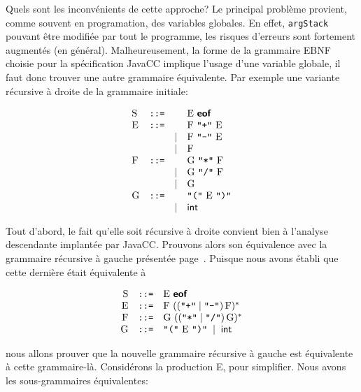 \documentclass[11pt,a4paper]{article}
\newcommand{\assign}{\mbox{\texttt{::=}}\xspace}
\newcommand{\JavaCC}{\textsf{JavaCC}\xspace}
\newcommand{\str}[1]{\texttt{"{#1}"}}
\newcommand{\eof}{\textsf{\textbf{eof}}\xspace}
\begin{document}
Quels sont les inconvénients de cette approche? Le principal problème
provient, comme souvent en programation, des variables globales.
En effet, \texttt{\small argStack} pouvant être modifiée par tout le
programme, les risques d'erreurs sont fortement augmentés (en
général). Malheureusement, la forme de la grammaire EBNF choisie pour la
spécification \JavaCC implique l'usage d'une variable globale, il faut
donc trouver une autre grammaire équivalente. Par exemple une variante
récursive à droite de la grammaire initiale:

\[
\begin{array}{lcrl}
  \textrm{S} & \assign &      & \textrm{E} \ \eof\\
  \textrm{E} & \assign &      & \textrm{F} \ \str{+} \ \textrm{E}\\
             &         & \mid & \textrm{F} \ \str{-} \ \textrm{E}\\
             &         & \mid & \textrm{F}\\
  \textrm{F} & \assign &      & \textrm{G} \ \str{*} \ \textrm{F}\\
             &         & \mid & \textrm{G} \ \str{/} \ \textrm{F}\\
             &         & \mid & \textrm{G}\\
  \textrm{G} & \assign &      & \str{(} \ \textrm{E} \ \str{)}\\
             &         & \mid & \textsf{int}
\end{array}
\]

\noindent Tout d'abord, le fait qu'elle soit récursive à droite
convient bien à l'analyse descendante implantée par \JavaCC. Prouvons
alors son équivalence avec la grammaire récursive à gauche présentée
page~\pageref{left_rec}. Puisque nous avons établi que cette dernière
était équivalente à

\[
\begin{array}{rcl}
  \textrm{S} & \assign & \textrm{E} \ \eof\\
  \textrm{E} & \assign & \textrm{F} \ ((\str{+} \mid
  \str{-}) \, \textrm{F})^{*}\\
  \textrm{F} & \assign & \textrm{G} \ ((\str{*} \mid
  \str{/}) \, \textrm{G})^{*}\\
  \textrm{G} & \assign & \str{(} \ \textrm{E} \ \str{)}
  \; \mid \; \textsf{int}
\end{array}
\]

\noindent nous allons prouver que la nouvelle grammaire récursive à
gauche est équivalente à cette grammaire-là. Considérons la production
E, pour simplifier. Nous avons les sous-grammaires équivalentes:
\end{document}
